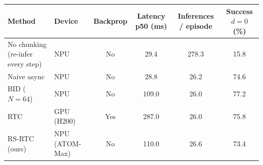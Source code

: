 \begin{tabular}{l l c c c c}
\toprule
Method & Device & Backprop & Latency p50 (ms) & Inferences / episode & Success $d{=}0$ (\%) \\
\midrule
No chunking (re-infer every step) & NPU & No & 29.4 & 278.3 & 15.8 \\
Naive async & NPU & No & 28.8 & 26.2 & 74.6 \\
BID ($N{=}64$) & NPU & No & 109.0 & 26.0 & 77.2 \\
RTC & GPU (H200) & Yes & 287.0 & 26.0 & 75.8 \\
RS-RTC (ours) & NPU (ATOM-Max) & No & 110.0 & 26.6 & 73.4 \\
\bottomrule
\end{tabular}
